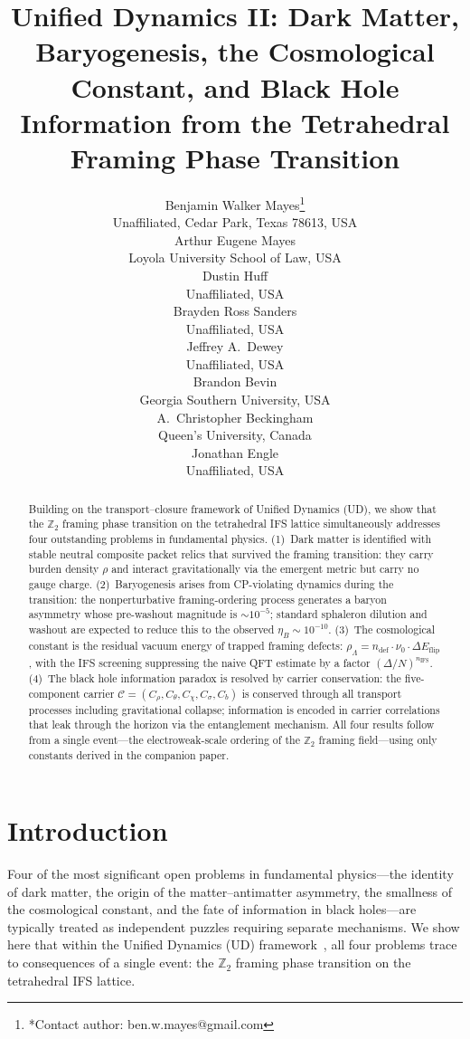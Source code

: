 \documentclass[11pt,twocolumn]{article}
\title{Unified Dynamics II: Dark Matter, Baryogenesis, the Cosmological Constant, and Black Hole Information from the Tetrahedral Framing Phase Transition}
\author{%
Benjamin Walker Mayes\thanks{*Contact author: ben.w.mayes@gmail.com}\\[4pt]
{\small Unaffiliated, Cedar Park, Texas 78613, USA}\\[8pt]
Arthur Eugene Mayes\\
{\small Loyola University School of Law, USA}\\[4pt]
Dustin Huff\\
{\small Unaffiliated, USA}\\[4pt]
Brayden Ross Sanders\\
{\small Unaffiliated, USA}\\[4pt]
Jeffrey A.\ Dewey\\
{\small Unaffiliated, USA}\\[4pt]
Brandon Bevin\\
{\small Georgia Southern University, USA}\\[4pt]
A.\ Christopher Beckingham\\
{\small Queen's University, Canada}\\[4pt]
Jonathan Engle\\
{\small Unaffiliated, USA}%
}
\date{}
\begin{document}
\maketitle

\begin{abstract}
Building on the transport--closure framework of Unified Dynamics (UD), we show that the $\mathbb{Z}_2$ framing phase transition on the tetrahedral IFS lattice simultaneously addresses four outstanding problems in fundamental physics.
(1)~Dark matter is identified with stable neutral composite packet relics that survived the framing transition: they carry burden density $\rho$ and interact gravitationally via the emergent metric but carry no gauge charge.
(2)~Baryogenesis arises from CP-violating dynamics during the transition: the nonperturbative framing-ordering process generates a baryon asymmetry whose pre-washout magnitude is $\sim 10^{-5}$; standard sphaleron dilution and washout are expected to reduce this to the observed $\eta_B\sim 10^{-10}$.
(3)~The cosmological constant is the residual vacuum energy of trapped framing defects: $\rho_\Lambda = n_{\mathrm{def}}\cdot\nu_0\cdot\Delta E_{\mathrm{flip}}$, with the IFS screening suppressing the naive QFT estimate by a factor $(\Delta/N)^{n_{\mathrm{IFS}}}$.
(4)~The black hole information paradox is resolved by carrier conservation: the five-component carrier $\mathcal{C}=(C_\rho,C_\theta,C_\chi,C_\sigma,C_b)$ is conserved through all transport processes including gravitational collapse; information is encoded in carrier correlations that leak through the horizon via the entanglement mechanism.
All four results follow from a single event---the electroweak-scale ordering of the $\mathbb{Z}_2$ framing field---using only constants derived in the companion paper.
\end{abstract}

\section{Introduction}
\label{sec:intro}

Four of the most significant open problems in fundamental physics---the identity of dark matter, the origin of the matter--antimatter asymmetry, the smallness of the cosmological constant, and the fate of information in black holes---are typically treated as independent puzzles requiring separate mechanisms.
We show here that within the Unified Dynamics (UD) framework~\cite{mayes2026ud,mayes2026grav}, all four problems trace to consequences of a single event: the $\mathbb{Z}_2$ framing phase transition on the tetrahedral IFS lattice.
\end{document}
